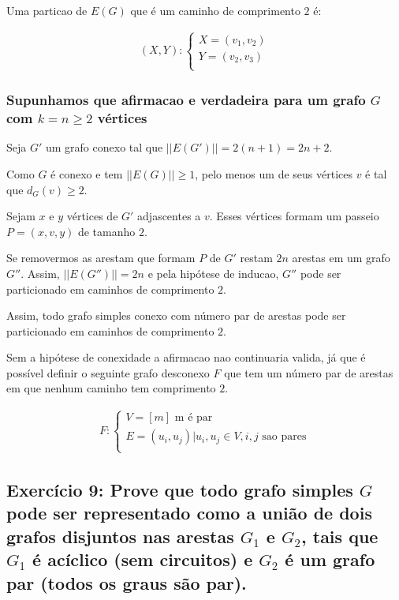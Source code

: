 \documentclass{article}
\begin{document}
Uma particao de $E(G)$ que é um caminho de comprimento $2$ é:

\begin{align}
	(X,Y) : 
	\begin{cases} 
		X = (v_1, v_2) \\
		Y = (v_2, v_3) \\
	\end{cases}
\end{align}
 
 
  \subsubsection{Supunhamos que afirmacao e verdadeira para um grafo $G$ com $k = n \geq 2$ vértices} 
  
  Seja $G'$ um grafo conexo tal que $||E(G')|| = 2(n+1) = 2n + 2$.
  
  Como $G$ é conexo e tem $||E(G)|| \geq 1$, pelo menos um de seus vértices $v$ é tal que $d_G(v) \geq 2$.
  
  Sejam $x$ e $y$ vértices de $G'$ adjascentes a $v$. Esses vértices formam um passeio $P = (x,v,y)$ de tamanho $2$.
  
  Se removermos as arestam que formam $P$ de $G'$ restam $2n$ arestas em um grafo $G''$. Assim, $||E(G'')|| = 2n$ e pela hipótese de inducao, $G''$ pode ser particionado em caminhos de comprimento $2$.
  
  Assim, todo grafo simples conexo com  número par de arestas pode ser particionado em caminhos de comprimento $2$. 
  
  Sem a hipótese de conexidade a afirmacao nao continuaria valida, já que é possível definir o seguinte grafo desconexo $F$ que tem um número par de arestas em que nenhum caminho tem comprimento $2$.
 
  \begin{align}
  	F : 
  	\begin{cases} 
  		V = [m] \text{   m é par} \\
  		E = {(u_i, u_j) | u_i, u_j \in V, i , j\text{   sao pares} }\\
  	\end{cases}
  \end{align}
  
  
  \clearpage
  
   \subsection{Exercício 9: Prove que todo grafo simples $G$ pode ser representado como a união de dois grafos disjuntos nas arestas $G_1$ e $G_2$, tais que $G_1$ é acíclico (sem circuitos) e $G_2$ é um grafo par (todos os graus são par).}
  
\end{document}
